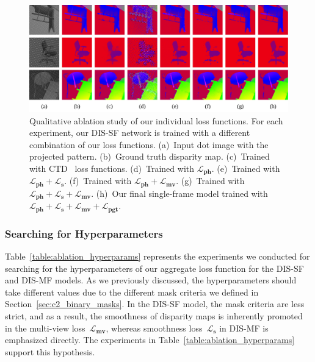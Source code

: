 \begin{figure}[t]
    \begin{center}
        \includegraphics[width=1\linewidth]{images/chapter2/supp_figures/ablation_loss.jpg}
    \end{center}
   \caption{Qualitative ablation study of our individual loss functions. For each experiment, our DIS-SF network is trained with a different combination of our loss functions. (a)~Input dot image with the projected pattern. (b)~Ground truth disparity map. (c)~Trained with CTD~\citep{riegler2019connecting} loss functions. (d)~Trained with $\boldsymbol{\mathcal{L}_{ph}}$. (e)~Trained with $\boldsymbol{\mathcal{L}_{ph}} + \boldsymbol{\mathcal{L}_s}$. (f)~Trained with $\boldsymbol{\mathcal{L}_{ph}} + \boldsymbol{\mathcal{L}_{mv}}$. (g)~Trained with $\boldsymbol{\mathcal{L}_{ph}} + \boldsymbol{\mathcal{L}_s} + \boldsymbol{\mathcal{L}_{mv}}$. (h)~Our final single-frame model trained with $\boldsymbol{\mathcal{L}_{ph}} + \boldsymbol{\mathcal{L}_s} + \boldsymbol{\mathcal{L}_{mv}} + \boldsymbol{\mathcal{L}_{pgt}}$.}
    \label{fig:c2_ablation_loss}
\end{figure}

\subsubsection{Searching for Hyperparameters}
Table~\ref{table:ablation_hyperparams} represents the experiments we conducted for searching for the hyperparameters of our aggregate loss function for the DIS-SF and DIS-MF models. As we previously discussed, the hyperparameters should take different values due to the different mask criteria we defined in Section~\ref{sec:c2_binary_masks}. In the DIS-SF model, the mask criteria are less strict, and as a result, the smoothness of disparity maps is inherently promoted in the multi-view loss~$\boldsymbol{\mathcal{L}_{mv}}$, whereas smoothness loss~$\boldsymbol{\mathcal{L}_{s}}$ in DIS-MF is emphasized directly. The experiments in Table~\ref{table:ablation_hyperparams} support this hypothesis.

